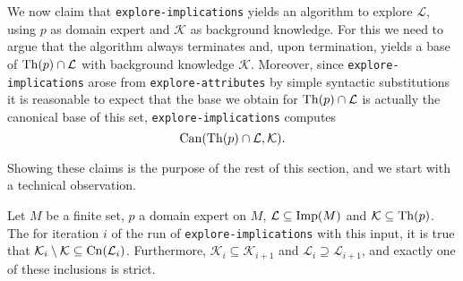 We now claim that \lstinline{explore-implications} yields an algorithm to explore
$\mathcal{L}$, using $p$ as domain expert and $\mathcal{K}$ as background knowledge.  For
this we need to argue that the algorithm always terminates and, upon termination, yields a
base of $\operatorname{Th}(p) \cap \mathcal{L}$ with background knowledge $\mathcal{K}$.  Moreover,
since \lstinline{explore-implications} arose from \lstinline{explore-attributes} by simple
syntactic substitutions it is reasonable to expect that the base we obtain for $\operatorname{Th}(p)
\cap \mathcal{L}$ is actually the canonical base of this set, \ie
\lstinline{explore-implications} computes
\begin{equation*}
  \operatorname{Can}(\operatorname{Th}(p) \cap \mathcal{L}, \mathcal{K}).
\end{equation*}

Showing these claims is the purpose of the rest of this section, and we start with a
technical observation.
\begin{Proposition}
  \label{prop:technicalities-about-explore-implications}
  Let $M$ be a finite set, $p$ a domain expert on $M$, $\mathcal{L} \subseteq \operatorname{Imp}(M)$ and
  $\mathcal{K} \subseteq \operatorname{Th}(p)$.  The for iteration $i$ of the run of
  \lstinline{explore-implications} with this input, it is true that
  $\mathcal{K}_i\setminus \mathcal{K} \subseteq \operatorname{Cn}(\mathcal{L}_i)$.  Furthermore, $\mathcal{K}_i \subseteq \mathcal{K}_{i+1}$ and
  $\mathcal{L}_i \supseteq \mathcal{L}_{i+1}$, and exactly one of these inclusions is
  strict.
\end{Proposition}
